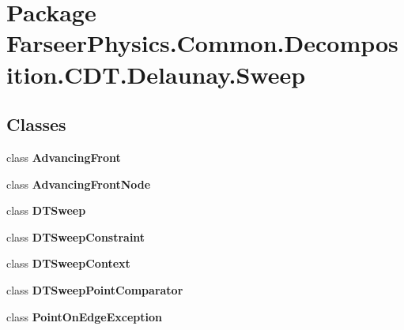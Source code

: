 \hypertarget{namespace_farseer_physics_1_1_common_1_1_decomposition_1_1_c_d_t_1_1_delaunay_1_1_sweep}{\section{Package Farseer\+Physics.\+Common.\+Decomposition.\+C\+D\+T.\+Delaunay.\+Sweep}
\label{namespace_farseer_physics_1_1_common_1_1_decomposition_1_1_c_d_t_1_1_delaunay_1_1_sweep}
}
\subsection*{Classes}
\begin{DoxyCompactItemize}
\item 
class {\bfseries Advancing\+Front}
\item 
class {\bfseries Advancing\+Front\+Node}
\item 
class {\bfseries D\+T\+Sweep}
\item 
class {\bfseries D\+T\+Sweep\+Constraint}
\item 
class {\bfseries D\+T\+Sweep\+Context}
\item 
class {\bfseries D\+T\+Sweep\+Point\+Comparator}
\item 
class {\bfseries Point\+On\+Edge\+Exception}
\end{DoxyCompactItemize}
